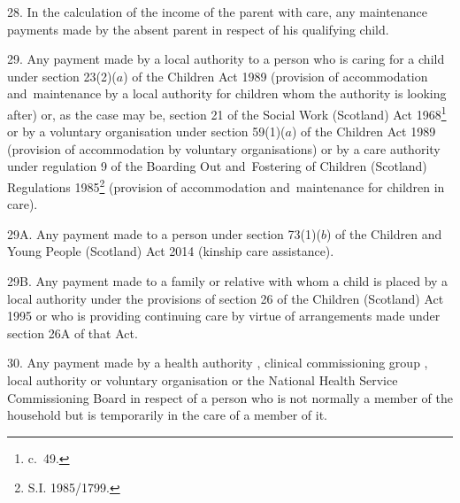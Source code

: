 \documentclass[12pt,a4paper]{article}
\begin{document}
\medskip

28.  In the calculation of the income of the parent with care, any maintenance payments made by the absent parent in respect of his qualifying child.

\medskip

29.  Any payment made by a local authority to a person who is caring for a child under section 23(2)($a$) of the Children Act 1989 (provision of accommodation and~maintenance by a local authority for children whom the authority is looking after) or, as the case may be, section 21 of the Social Work (Scotland) Act 1968\footnote{ c.~49.} or by a voluntary organisation under section 59(1)($a$) of the Children Act 1989 (provision of accommodation by voluntary organisations) or by a care authority under regulation 9 of the Boarding Out and~Fostering of Children (Scotland) Regulations 1985\footnote{\frenchspacing S.I. 1985/1799.} (provision of accommodation and~maintenance for children in care).


\medskip

29A.  Any payment made to a person under section 73(1)($b$) of the Children and Young People (Scotland) Act 2014 (kinship care assistance).

\medskip

29B.  Any payment made to a family or relative with whom a child is placed by a local authority under the provisions of section 26 of the Children (Scotland) Act 1995 or who is providing continuing care by virtue of arrangements made under section 26A of that Act.

\medskip

30.  Any payment made by a health authority%
, 
clinical commissioning group%
, local authority or voluntary organisation 
or the National Health Service Commissioning Board  %
in respect of a person who is not normally a member of the household but is temporarily in the care of a member of it.

\end{document}

